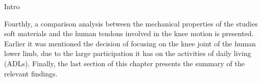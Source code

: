 Intro



Fourthly, a comparison analysis between the mechanical properties of the studies soft materials and the human tendons involved in the knee motion is presented. Earlier it was mentioned the decision of focusing on the knee joint of the human lower limb, due to the large participation it has on the activities of daily living (ADLs). Finally, the last section of this chapter presents the summary of the relevant findings.


